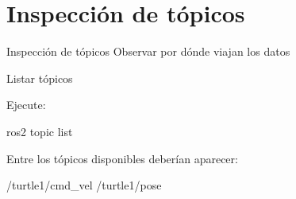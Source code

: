 \documentclass[aspectratio=169]{beamer}
\begin{document}
\section{Inspección de tópicos}

\SectionSlide
{Inspección de tópicos}
{Observar por dónde viajan los datos}

\begin{frame}[fragile]{Listar tópicos}

Ejecute:

\begin{bashcodedark}
    ros2 topic list
\end{bashcodedark}

Entre los tópicos disponibles deberían aparecer:

\begin{bashcode}
    /turtle1/cmd_vel
    /turtle1/pose
\end{bashcode}

\vspace{0.3cm}


\end{frame}
\end{document}
